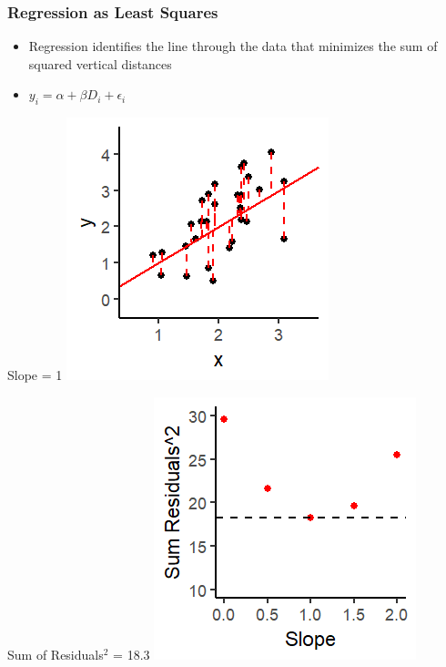 \documentclass[xcolor=x11names,compress]{beamer}\usepackage[]{graphicx}\usepackage[]{color}
\makeatletter
\def\maxwidth{ %
  \ifdim\Gin@nat@width>\linewidth
    \linewidth
  \else
    \Gin@nat@width
  \fi
}
\newenvironment{knitrout}{}{} %
\renewcommand{\(}{\begin{columns}}
\renewcommand{\)}{\end{columns}}
\newcommand{\<}[1]{\begin{column}{#1}}
\renewcommand{\>}{\end{column}}
\makeatother
\begin{document}
\begin{frame}
\frametitle{Regression as Least Squares}
\begin{itemize}
\item Regression identifies the line through the data that minimizes the sum of squared vertical distances 
\item $y_i = \alpha + \beta D_i + \epsilon_i$
\end{itemize}
\begin{multicols}{2}
Slope = 1
\begin{knitrout}
\color{fgcolor}
\includegraphics[width=\maxwidth]{figure/graph_ols6-1} 

\end{knitrout}
\columnbreak
Sum of Residuals$^2$ = 18.3
\begin{knitrout}
\color{fgcolor}
\includegraphics[width=\maxwidth]{figure/graph_ssr6-1} 

\end{knitrout}
\end{multicols}
\end{frame}
\end{document}

